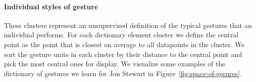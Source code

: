 \documentclass[10pt,twocolumn,letterpaper]{article}
\newcommand{\mypar}[1]{\vspace{-2mm}\paragraph{#1}}
\begin{document}
\mypar{Individual styles of gesture} These clusters represent an unsupervised definition of the typical gestures that an individual performs. For each dictionary element cluster we define the central point as the point that is closest on average to all datapoints in the cluster. We sort the gesture units in each cluster by their distance to the central point and pick the most central ones for display. We visualize some examples of the dictionary of gestures we learn for Jon Stewart in Figure~\ref{fig:space-of-gesures}. 
\end{document}
